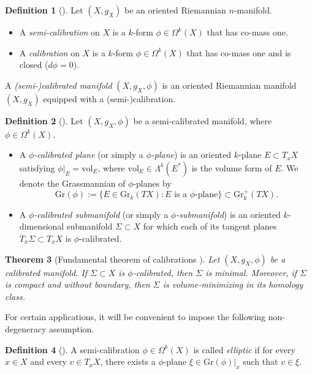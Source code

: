 \documentclass[11pt]{article}
\newcommand{\vol}{\mathrm{vol}}
\newtheorem{thm}{Theorem}[section]
\theoremstyle{definition}
\newtheorem{defn}[thm]{Definition}
\numberwithin{equation}{section}
\begin{document}
\begin{defn}[\cite{harvey1982calibrated}] Let $(X, g_X)$ be an oriented Riemannian $n$-manifold.
\begin{itemize}
\item A \emph{semi-calibration} on $X$ is a $k$-form $\phi \in \Omega^k(X)$ that has co-mass one.
\item A \emph{calibration} on $X$ is a $k$-form $\phi \in \Omega^k(X)$ that has co-mass one and is closed ($d\phi = 0$).
\end{itemize}
A \emph{(semi-)calibrated manifold} $(X, g_X, \phi)$ is an oriented Riemannian manifold $(X, g_X)$ equipped with a (semi-)calibration.
\end{defn}


\begin{defn}[\cite{harvey1982calibrated}] Let $(X, g_X, \phi)$ be a semi-calibrated manifold, where $\phi \in \Omega^k(X)$.
\begin{itemize}
\item A \emph{$\phi$-calibrated plane} (or simply a \emph{$\phi$-plane}) is an oriented $k$-plane $E \subset T_xX$ satisfying $\phi|_E = \vol_E$, where $\vol_E \in \Lambda^k(E^*)$ is the volume form of $E$.  We denote the Grassmannian of $\phi$-planes by
$$\mathrm{Gr}(\phi) := \{E \in \mathrm{Gr}_k(TX) \colon E \text{ is a }\phi\text{-plane}\} \subset \mathrm{Gr}_k^+(TX).$$
\item A \emph{$\phi$-calibrated submanifold} (or simply a \emph{$\phi$-submanifold}) is an oriented $k$-dimensional submanifold $\Sigma \subset X$ for which each of its tangent planes $T_x\Sigma \subset T_xX$ is $\phi$-calibrated.
\end{itemize}
\end{defn}

\begin{thm}[Fundamental theorem of calibrations \cite{harvey1982calibrated}] \label{thm:FundThmCal} Let $(X, g_X, \phi)$ be a calibrated manifold.  If $\Sigma \subset X$ is $\phi$-calibrated, then $\Sigma$ is minimal.  Moreover, if $\Sigma$ is compact and without boundary, then $\Sigma$ is volume-minimizing in its homology class.
\end{thm}

\indent For certain applications, it will be convenient to impose the following non-degeneracy assumption.

\begin{defn}[\cite{harvey2009introduction}] A semi-calibration $\phi \in \Omega^k(X)$ is called \emph{elliptic} if for every $x \in X$ and every $v \in T_xX$, there exists a $\phi$-plane $\xi \in \mathrm{Gr}(\phi)|_x$ such that $v \in \xi$.
\end{defn}
\end{document}
